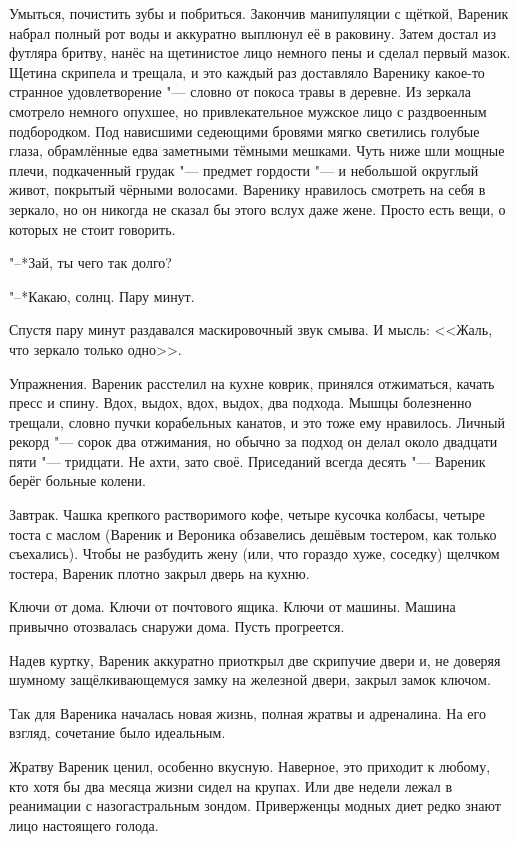 Умыться, почистить зубы и побриться.
Закончив манипуляции с щёткой, Вареник набрал полный рот воды и аккуратно выплюнул её в раковину.
Затем достал из футляра бритву, нанёс на щетинистое лицо немного пены и сделал первый мазок.
Щетина скрипела и трещала, и это каждый раз доставляло Варенику какое-то странное удовлетворение "--- словно от покоса травы в деревне.
Из зеркала смотрело немного опухшее, но привлекательное мужское лицо с раздвоенным подбородком.
Под нависшими седеющими бровями мягко светились голубые глаза, обрамлённые едва заметными тёмными мешками.
Чуть ниже шли мощные плечи, подкаченный грудак "--- предмет гордости "--- и небольшой округлый живот, покрытый чёрными волосами.
Варенику нравилось смотреть на себя в зеркало, но он никогда не сказал бы этого вслух даже жене.
Просто есть вещи, о которых не стоит говорить.

"--*Зай, ты чего так долго?

"--*Какаю, солнц.
Пару минут.

Спустя пару минут раздавался маскировочный звук смыва.
И мысль:
<<Жаль, что зеркало только одно>>.

Упражнения.
Вареник расстелил на кухне коврик, принялся отжиматься, качать пресс и спину.
Вдох, выдох, вдох, выдох, два подхода.
Мышцы болезненно трещали, словно пучки корабельных канатов, и это тоже ему нравилось.
Личный рекорд "--- сорок два отжимания, но обычно за подход он делал около двадцати пяти "--- тридцати.
Не ахти, зато своё.
Приседаний всегда десять "--- Вареник берёг больные колени.

Завтрак.
Чашка крепкого растворимого кофе, четыре кусочка колбасы, четыре тоста с маслом (Вареник и Вероника обзавелись дешёвым тостером, как только съехались).
Чтобы не разбудить жену (или, что гораздо хуже, соседку) щелчком тостера, Вареник плотно закрыл дверь на кухню.

Ключи от дома.
Ключи от почтового ящика.
Ключи от машины.
Машина привычно отозвалась снаружи дома.
Пусть прогреется.

Надев куртку, Вареник аккуратно приоткрыл две скрипучие двери и, не доверяя шумному защёлкивающемуся замку на железной двери, закрыл замок ключом.

\asterism

Так для Вареника началась новая жизнь, полная жратвы и адреналина.
На его взгляд, сочетание было идеальным.

Жратву Вареник ценил, особенно вкусную.
Наверное, это приходит к любому, кто хотя бы два месяца жизни сидел на крупах.
Или две недели лежал в реанимации с назогастральным зондом.
Приверженцы модных диет редко знают лицо настоящего голода.

